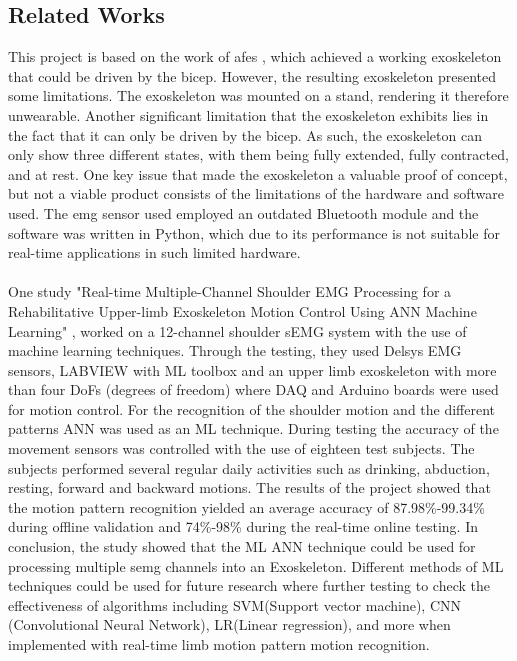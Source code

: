 \subsection{Related Works}
This project is based on the work of \acrfull{afes} \cite{AFES}, which achieved a working exoskeleton that could be driven by the bicep. However, the resulting 
exoskeleton presented some limitations. The exoskeleton was mounted on a stand, rendering it therefore unwearable. Another significant limitation 
that the exoskeleton exhibits lies in the fact that it can only be driven by the bicep. As such, the exoskeleton can only show three different states, 
with them being fully extended, fully contracted, and at rest. One key issue that made the exoskeleton a valuable proof of concept, but not a viable 
product consists of the limitations of the hardware and software used. The \acrshort{emg} sensor used employed an outdated Bluetooth module and the software was 
written in Python, which due to its performance is not suitable for real-time applications in such limited hardware. 
\\\\
One study "Real-time Multiple-Channel Shoulder EMG Processing for a Rehabilitative Upper-limb Exoskeleton Motion Control Using ANN Machine Learning" \cite{shoulderexo},
worked on a 12-channel shoulder sEMG system with the use of machine learning techniques. Through the testing, they used Delsys EMG sensors, LABVIEW with ML toolbox and an 
upper limb exoskeleton with more than four DoFs (degrees of freedom) where DAQ and Arduino boards were used for motion control. For the recognition of the shoulder motion and the different patterns ANN was used as an 
ML technique. During testing the accuracy of the movement sensors was controlled with the use of eighteen test subjects. The subjects performed several regular daily activities
such as drinking, abduction, resting, forward and backward motions. The results of the project showed that the motion pattern recognition yielded an average accuracy of 87.98\%-99.34\% 
during offline validation and 74\%-98\% during the real-time online testing. In conclusion, the study showed that the ML ANN technique could be used for processing multiple \acrshort{semg} channels
into an Exoskeleton. Different methods of ML techniques could be used for future research  where further testing to check the effectiveness of algorithms including SVM(Support vector machine),
CNN (Convolutional Neural Network), LR(Linear regression), and more when implemented with real-time limb motion pattern motion recognition.
